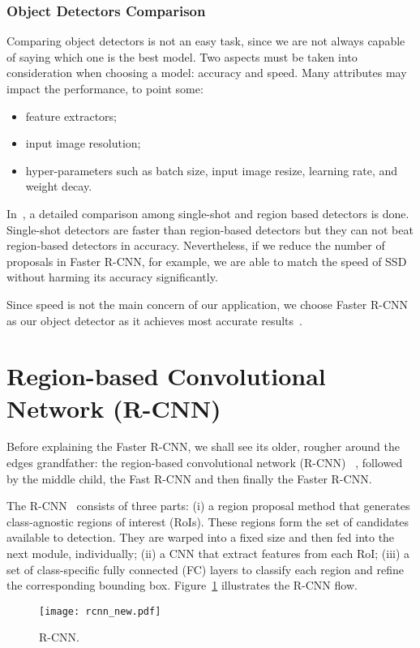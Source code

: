 \subsubsection{Object Detectors Comparison}
%
Comparing object detectors is not an easy task, since we are not always capable of saying which one is the best model.
Two aspects must be taken into consideration when choosing a model: accuracy and speed.
Many attributes may impact the performance, to point some:
\begin{itemize}
 \item feature extractors;
 \item input image resolution;
 \item hyper-parameters such as batch size, input image resize, learning rate, and weight decay.
\end{itemize}

In~\cite{Huang2017}, a detailed comparison among single-shot and region based detectors is done.
Single-shot detectors are faster than region-based detectors
but they can not beat region-based detectors in accuracy.
Nevertheless, if we reduce the number of proposals in Faster R-CNN, for example, we are able to match the speed of SSD without harming its accuracy significantly.

Since speed is not the main concern of our application, we choose Faster R-CNN as our object detector as it achieves most accurate results~\cite{Huang2017}.

\section{Region-based Convolutional Network (R-CNN)}
%
Before explaining the Faster R-CNN, we shall see its older, rougher around the edges grandfather:
the region-based convolutional network (R-CNN)~\cite{Girshick2016RCNN}
, followed by the middle child, the Fast R-CNN and then finally the Faster R-CNN.

The R-CNN~\cite{Girshick2016RCNN}
 consists of three parts:
(i) a region proposal method that generates class-agnostic regions of interest (RoIs).
These regions form the set of candidates available to detection.
They are warped into a fixed size and then fed into the next module, individually;
(ii) a CNN that extract features from each RoI;
(iii) a set of class-specific fully connected (FC)
layers to classify each region and refine the corresponding bounding box.
Figure~\ref{fig:R-CNN} illustrates the R-CNN flow.
%
%
\begin{figure}[th!]
	\centering
	\texttt{[image: rcnn\_new.pdf]}
	\caption{R-CNN.}
	\label{fig:R-CNN}
\end{figure}


